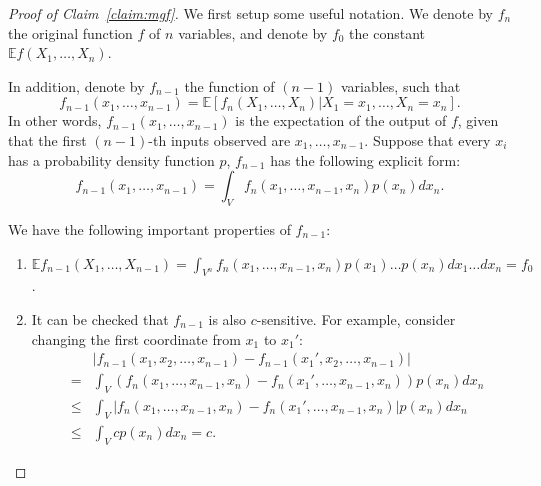 \documentclass{article}
\newcommand{\EE}{\mathbb{E}} %
\begin{document}
\begin{proof}[Proof of Claim~\ref{claim:mgf}]
We first setup some useful notation. We denote by
$f_n$ the original function $f$ of $n$ variables, and denote by $f_0$ the constant
$\EE f(X_1,\ldots,X_n)$.

In addition, denote by $f_{n-1}$ the function of $(n-1)$ variables,
such that
\[ f_{n-1}(x_1,\ldots,x_{n-1}) = \EE[f_n(X_1, \ldots, X_n)|X_1 = x_1,\ldots, X_n = x_n]. \]
In other words, $f_{n-1}(x_1, \ldots, x_{n-1})$ is the expectation of the output of $f$, given that the first $(n-1)$-th inputs observed are $x_1, \ldots, x_{n-1}$.
Suppose that every $x_i$ has a probability density function $p$, $f_{n-1}$ has the following explicit form:
\[ f_{n-1}(x_1, \ldots, x_{n-1}) = \int_V f_n(x_1, \ldots, x_{n-1}, x_n) p(x_n) d x_n. \]

We have the following important properties of $f_{n-1}$:
\begin{enumerate}
  \item $\EE f_{n-1}(X_1, \ldots, X_{n-1}) = \int_{V^n} f_n(x_1, \ldots, x_{n-1}, x_n) p(x_1) \ldots p(x_n) dx_1 \ldots d x_n = f_0$.
  \item It can be checked that $f_{n-1}$ is also $c$-sensitive. For example, consider changing the first coordinate from $x_1$ to $x_1'$:
  \begin{eqnarray*}
    && |f_{n-1}(x_1, x_2, \ldots,x_{n-1}) - f_{n-1}(x_1', x_2, \ldots,x_{n-1})| \\
    &=& \int_V (f_n(x_1, \ldots, x_{n-1}, x_n) - f_n(x_1', \ldots, x_{n-1}, x_n) ) p(x_n) d x_n \\
    &\leq& \int_V |f_n(x_1, \ldots, x_{n-1}, x_n) - f_n(x_1', \ldots, x_{n-1}, x_n) | p(x_n) d x_n \\
    &\leq& \int_V c p(x_n) d x_n = c.
  \end{eqnarray*}
\end{enumerate}


\end{proof}
\end{document}
